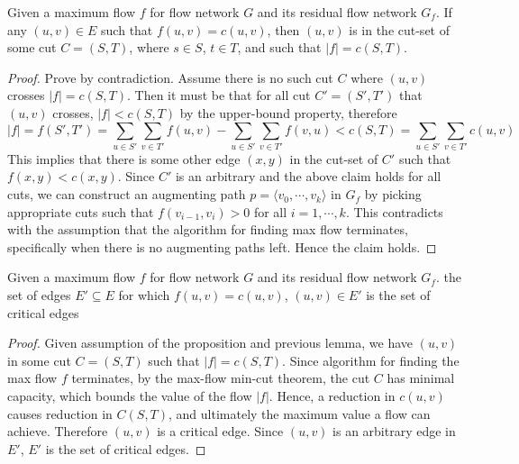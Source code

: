 \documentclass[11pt]{article}
\begin{document}
\begin{solution}
    \begin{lemma*}
        Given a maximum flow $f$ for flow network $G$ and its residual flow network $G_f$. If any $(u,v)\in E$ such that $f(u,v) = c(u,v)$, then $(u,v)$ is in the cut-set of some cut $C = (S,T)$, where $s\in S$, $t\in T$, and such that $|f| = c(S,T)$.
        \begin{proof}
            Prove by contradiction. Assume there is no such cut $C$ where $(u,v)$ crosses $|f| = c(S,T)$. Then it must be that for all cut $C' = (S', T')$ that $(u,v)$ crosses, $|f| < c(S,T)$ by the upper-bound property, therefore
            \[
                |f| = f(S', T') = \sum_{u\in S'} \sum_{v\in T'} f(u, v) - \sum_{u\in S'} \sum_{v\in T'} f(v, u)   < c(S,T) = \sum_{u\in S'} \sum_{v\in T'} c(u, v) 
            \]
            This implies that there is some other edge $(x,y)$ in the cut-set of $C'$ such that $f(x,y) < c(x,y)$. Since $C'$ is an arbitrary and the above claim holds for all cuts, we can construct an augmenting path $p = \langle v_0, \cdots, v_k \rangle$ in $G_f$ by picking appropriate cuts such that $f(v_{i-1}, v_i) > 0$ for all $i = 1,\cdots, k$. This contradicts with the assumption that the algorithm for finding max flow terminates, specifically when there is no augmenting paths left. Hence the claim holds.
        \end{proof}
    \end{lemma*}

    \begin{proposition*}
        Given a maximum flow $f$ for flow network $G$ and its residual flow network $G_f$. the set of edges $E' \subseteq E$ for which $f(u,v) = c(u,v)$, $(u,v) \in E'$ is the set of critical edges
        \begin{proof}
            Given assumption of the proposition and previous lemma, we have $(u,v)$ in some cut $C =(S,T)$ such that $|f| = c(S,T)$. Since algorithm for finding the max flow $f$ terminates, by the max-flow min-cut theorem, the cut $C$ has minimal capacity, which bounds the value of the flow $|f|$. Hence, a reduction in $c(u,v)$ causes reduction in $C(S,T)$, and ultimately the maximum value a flow can achieve. Therefore $(u,v)$ is a critical edge. Since $(u,v)$ is an arbitrary edge in $E'$, $E'$ is the set of critical edges. 
        \end{proof}
    \end{proposition*}

\end{solution}
\end{document}
